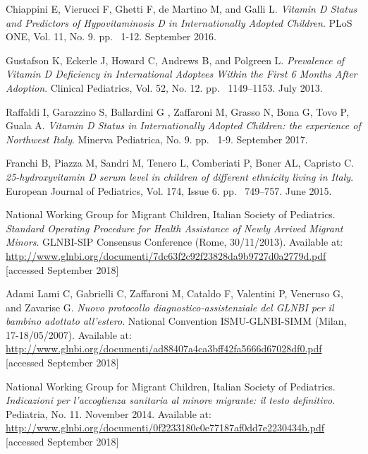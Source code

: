 \begin{thebibliography}{50}
  Chiappini E, Vierucci F, Ghetti F, de Martino M, and Galli L.
  \textit{Vitamin D Status and Predictors of Hypovitaminosis D in Internationally Adopted Children}.
  PLoS ONE, Vol. 11, No. 9.
  pp. ~1-12.
  September 2016.
  
  Gustafson K, Eckerle J, Howard C, Andrews B, and Polgreen L.
  \textit{Prevalence of Vitamin D Deficiency in International Adoptees Within the First 6 Months After Adoption}.
  Clinical Pediatrics, Vol. 52, No. 12.
  pp. ~1149–1153.
  July 2013.
  
  Raffaldi I, Garazzino S, Ballardini G , Zaffaroni M, Grasso N, Bona G, Tovo P, Guala A.
  \textit{Vitamin D Status in Internationally Adopted Children: the experience of Northwest Italy}.
  Minerva Pediatrica, No. 9.
  pp. ~1-9.
  September 2017.
  
  Franchi B, Piazza M, Sandri M, Tenero L, Comberiati P, Boner AL, Capristo C.
  \textit{25-hydroxyvitamin D serum level in children of different ethnicity living in Italy}.
  European Journal of Pediatrics, Vol. 174, Issue 6.
  pp. ~749–757.
  June 2015.
  
  National Working Group for Migrant Children, Italian Society of Pediatrics.
  \textit{Standard Operating Procedure for Health Assistance of Newly Arrived Migrant Minors}.
  GLNBI-SIP Consensus Conference (Rome, 30/11/2013).
  Available at: \url{http://www.glnbi.org/documenti/7dc63f2c92f23828da9b9727d0a2779d.pdf} [accessed September 2018]
  
  Adami Lami C, Gabrielli C, Zaffaroni M, Cataldo F, Valentini P, Veneruso G, and Zavarise G.
  \textit{Nuovo protocollo diagnostico-assistenziale del GLNBI per il bambino adottato all'estero}.
   National Convention ISMU-GLNBI-SIMM (Milan, 17-18/05/2007).
  Available at: \url{http://www.glnbi.org/documenti/ad88407a4ca3bff42fa5666d67028df0.pdf} [accessed September 2018]
  
  National Working Group for Migrant Children, Italian Society of Pediatrics.
  \textit{Indicazioni per l’accoglienza sanitaria al minore migrante: il testo definitivo}.
  Pediatria, No. 11.
  November 2014.
  Available at: \url{http://www.glnbi.org/documenti/0f2233180e0e77187af0dd7e2230434b.pdf} [accessed September 2018]
  

\end{thebibliography}
